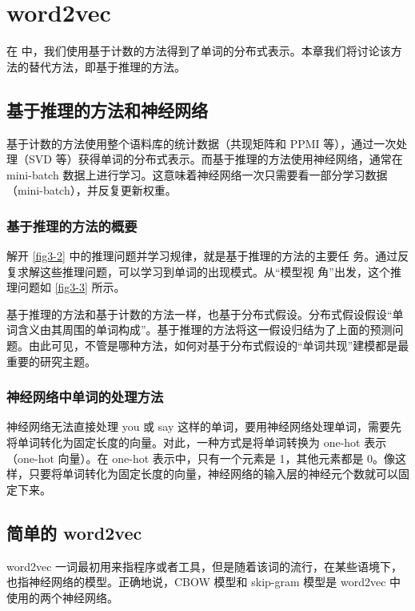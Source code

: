 \chapter{word2vec\label{Ch03}}
在  中，我们使用基于计数的方法得到了单词的分布式表示。本章我们将讨论该方法的替代方法，即基于推理的方法。

\section{基于推理的方法和神经网络}
基于计数的方法使用整个语料库的统计数据（共现矩阵和 PPMI 等），通过一次处理（SVD 等）获得单词的分布式表示。而基于推理的方法使用神经网络，通常在 mini-batch 数据上进行学习。这意味着神经网络一次只需要看一部分学习数据（mini-batch），并反复更新权重。
\subsection{基于推理的方法的概要}
解开 \autoref{fig3-2} 中的推理问题并学习规律，就是基于推理的方法的主要任
务。通过反复求解这些推理问题，可以学习到单词的出现模式。从“模型视
角”出发，这个推理问题如 \autoref{fig3-3} 所示。

\begin{tcolorbox}
    基于推理的方法和基于计数的方法一样，也基于分布式假设。分布式假设假设“单词含义由其周围的单词构成”。基于推理的方法将这一假设归结为了上面的预测问题。由此可见，不管是哪种方法，如何对基于分布式假设的“单词共现”建模都是最重要的研究主题。
\end{tcolorbox}
\subsection{神经网络中单词的处理方法}
神经网络无法直接处理 you 或 say 这样的单词，要用神经网络处理单词，需要先将单词转化为固定长度的向量。对此，一种方式是将单词转换为 one-hot 表示（one-hot 向量）。在 one-hot 表示中，只有一个元素是 1，其他元素都是 0。像这样，只要将单词转化为固定长度的向量，神经网络的输入层的神经元个数就可以固定下来。
\section{简单的 word2vec}
\begin{tcolorbox}
    word2vec 一词最初用来指程序或者工具，但是随着该词的流行，在某些语境下，也指神经网络的模型。正确地说，CBOW 模型和 skip-gram 模型是 word2vec 中使用的两个神经网络。
\end{tcolorbox}

